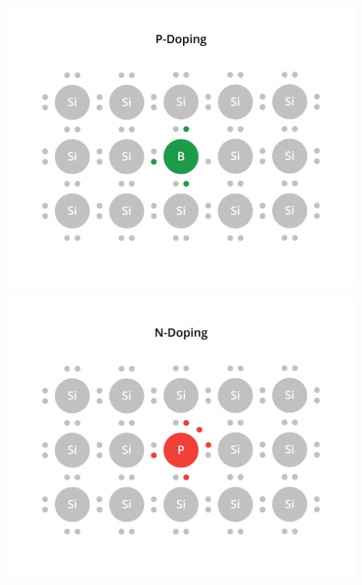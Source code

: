 \includegraphics[width=.75\textwidth]{doping-26.png}

\includegraphics[width=.75\textwidth]{doping-27.png}
